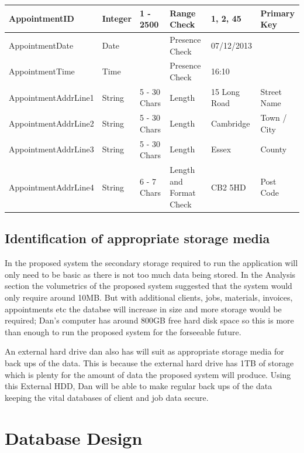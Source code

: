 \begin{flushleft}
\begin{longtable}{|p{3.6cm}|p{1.5cm}|p{2cm}|p{2cm}|p{2cm}|p{2cm}|}
AppointmentID & Integer & 1 - 2500 & Range Check & 1, 2, 45 & Primary Key \\ \hline
AppointmentDate & Date & & Presence Check  & 07/12/2013  & \\ \hline
AppointmentTime & Time &  & Presence Check  & 16:10 & \\ \hline
AppointmentAddrLine1 & String & 5 - 30 Chars & Length & 15 Long Road & Street Name \\ \hline
AppointmentAddrLine2 & String & 5 - 30 Chars & Length & Cambridge & Town / City \\ \hline
AppointmentAddrLine3 & String & 5 - 30 Chars & Length & Essex & County \\ \hline
AppointmentAddrLine4 & String & 6 - 7 Chars & Length and Format Check & CB2 5HD & Post Code \\ \hline

\end{longtable}
\end{flushleft}

\subsection{Identification of appropriate storage media}

\begin{flushleft}
In the proposed system the secondary storage required to run the application will only need to be basic as there is not too much data being stored. In the Analysis section the volumetrics of the proposed system suggested that the system would only require around 10MB. But with additional clients, jobs, materials, invoices, appointments etc the databse will increase in size and more storage would be required; Dan's computer has around 800GB free hard disk space so this is more than enough to run the proposed system for the forseeable future.

An external hard drive dan also has will suit as appropriate storage media for back ups of the data. This is because the external hard drive has 1TB of storage which is plenty for the amount of data the proposed system will produce. Using this External HDD, Dan will be able to make regular back ups of the data keeping the vital databases of client and job data secure.
\end{flushleft}

\pagebreak
\section{Database Design}

